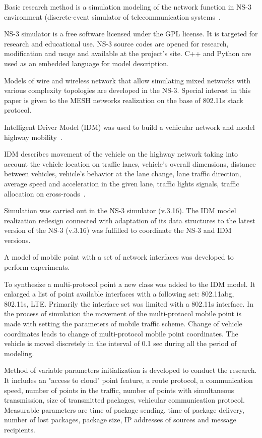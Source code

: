 \documentclass[a4paper,twoside]{article}
\begin{document}
Basic research method is a simulation modeling of the network function in NS-3 environment (discrete-event simulator of telecommunication systems~\cite{Nsnam.org}.

NS-3 simulator is a free software licensed under the GPL license. It is targeted for research and educational use. NS-3 source codes are opened for research, modification and usage and available at the project's site. C++ and Python are used as an embedded language for model description.

Models of wire and wireless network that allow simulating mixed networks with various complexity topologies are developed in the NS-3. Special interest in this paper is given to the MESH networks realization on the base of 802.11s stack protocol.

Intelligent Driver Model (IDM) was used to build a vehicular network and model highway mobility~\cite{citeulike:10001487}.

IDM describes movement of the vehicle on the highway network taking into account the vehicle location on traffic lanes, vehicle's overall dimensions, distance between vehicles, vehicle's behavior at the lane change, lane traffic direction, average speed and acceleration in the given lane, traffic lights signals, traffic allocation on cross-roads~\cite{5678993}.

Simulation was carried out in the NS-3 simulator (v.3.16). The IDM model realization redesign connected with adaptation of its data structures to the latest version of the NS-3 (v.3.16) was fulfilled to coordinate the NS-3 and IDM versions.

A model of mobile point with a set of network interfaces was developed to perform experiments.

To synthesize a multi-protocol point a new class was added to the IDM model. It enlarged a list of point available interfaces with a following set: 802.11abg, 802.11s, LTE. Primarily the interface set was limited with a 802.11s interface.
In the process of simulation the movement of the multi-protocol mobile point is made with setting the parameters of mobile traffic scheme. Change of vehicle coordinates leads to change of multi-protocol mobile point coordinates. The vehicle is moved discretely in the interval of 0.1 sec during all the period of modeling.

Method of variable parameters initialization is developed to conduct the research. It includes an "access to cloud" point feature, a route protocol, a communication speed, number of points in the traffic, number of points with simultaneous transmission, size of transmitted packages, vehicular communication protocol. Measurable parameters are time of package sending, time of package delivery, number of lost packages, package size, IP addresses of sources and message recipients.
\end{document}
